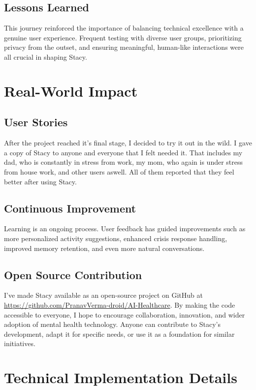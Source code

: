 \documentclass[12pt]{article}
\begin{document}
\subsection{Lessons Learned}
This journey reinforced the importance of balancing technical excellence with a genuine user experience. Frequent testing with diverse user groups, prioritizing privacy from the outset, and ensuring meaningful, human-like interactions were all crucial in shaping Stacy.

\section{Real-World Impact}

\subsection{User Stories}
After the project reached it's final stage, I decided to try it out in the wild. I gave a copy of Stacy to anyone and everyone that I felt needed it. That includes my dad, who is constantly in stress from work, my mom, who again is under stress from house work, and other users aswell. All of them reported that they feel better after using Stacy.

\subsection{Continuous Improvement}
Learning is an ongoing process. User feedback has guided improvements such as more personalized activity suggestions, enhanced crisis response handling, improved memory retention, and even more natural conversations.

\subsection{Open Source Contribution}
I've made Stacy available as an open-source project on GitHub at \url{https://github.com/PranavVerma-droid/AI-Healthcare}. By making the code accessible to everyone, I hope to encourage collaboration, innovation, and wider adoption of mental health technology. Anyone can contribute to Stacy's development, adapt it for specific needs, or use it as a foundation for similar initiatives.

\section{Technical Implementation Details}
\end{document}
